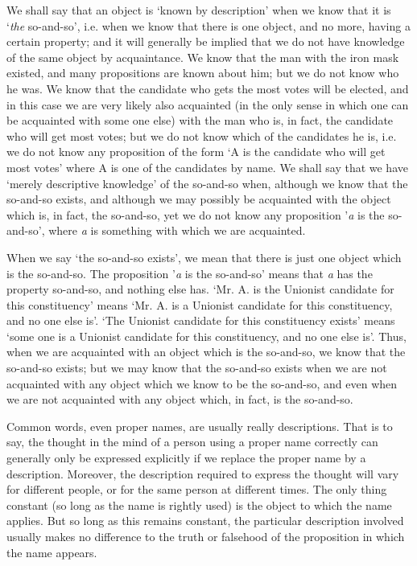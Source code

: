 \documentclass[oneside,letterpaper,12pt]{book}
\begin{document}
We shall say that an object is `known by
description' when we know that it is
`\emph{the} so-and-so', i.e. when we know that
there is one object, and no more, having a certain property; and it will
generally be implied that we do not have knowledge of the same object by
acquaintance. We know that the man with the iron mask existed, and many
propositions are known about him; but we do not know who he was. We know
that the candidate who gets the most votes will be elected, and in this
case we are very likely also acquainted (in the only sense in which one
can be acquainted with some one else) with the man who is, in fact, the
candidate who will get most votes; but we do not know which of the
candidates he is, i.e. we do not know any proposition of the form
`A is the candidate who will get most
votes' where A is one of the candidates by name. We
shall say that we have `merely descriptive
knowledge' of the so-and-so when, although we know that
the so-and-so exists, and although we may possibly be acquainted with
the object which is, in fact, the so-and-so, yet we do not know any
proposition '\emph{a} is the so-and-so',
where \emph{a} is something with which we are acquainted.

When we say `the so-and-so exists', we
mean that there is just one object which is the so-and-so. The
proposition '\emph{a} is the
so-and-so' means that \emph{a} has the property
so-and-so, and nothing else has. `Mr. A. is the Unionist
candidate for this constituency' means
`Mr. A. is a Unionist candidate for this constituency,
and no one else is'. `The Unionist
candidate for this constituency exists' means
`some one is a Unionist candidate for this constituency,
and no one else is'. Thus, when we are acquainted with an
object which is the so-and-so, we know that the so-and-so exists; but we
may know that the so-and-so exists when we are not acquainted with any
object which we know to be the so-and-so, and even when we are not
acquainted with any object which, in fact, is the so-and-so.

Common words, even proper names, are usually really descriptions. That
is to say, the thought in the mind of a person using a proper name
correctly can generally only be expressed explicitly if we replace the
proper name by a description. Moreover, the description required to
express the thought will vary for different people, or for the same
person at different times. The only thing constant (so long as the name
is rightly used) is the object to which the name applies. But so long as
this remains constant, the particular description involved usually makes
no difference to the truth or falsehood of the proposition in which the
name appears.
\end{document}
